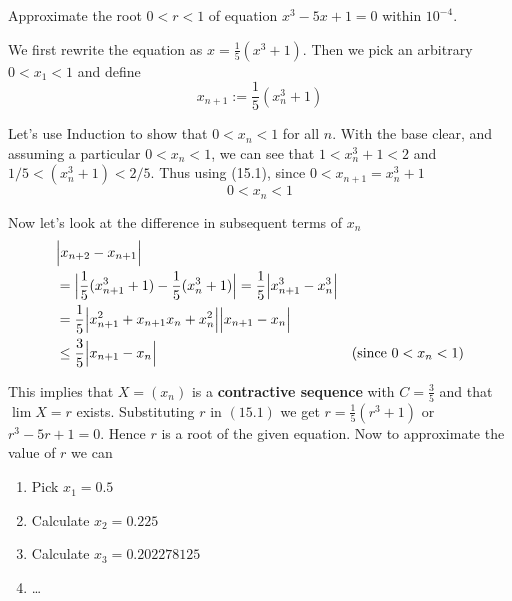 \documentclass[boxes, qed]{homework}
\DeclarePairedDelimiter\abs{\lvert}{\rvert}
\begin{document}
\newenvironment{amatrix}[1]{%
  \left[\begin{array}{@{}*{#1}{c}|c@{}}
}{%
  \end{array}\right]
}

\newenvironment{augmatrix}[1]{%
  \left[\begin{array}{#1}
}{%
  \end{array}\right]
}
\begin{problem}Approximate the root $0<r<1$ of equation
  $x^3-5x+1=0$ within $10^{-4}$.
\end{problem}
\begin{solution}We first rewrite the equation as $x=\frac{1}{5}(x^3+1)$.
  Then we pick an arbitrary $0<x_1<1$ and define
  \begin{equation}
    x_{n+1}:=\frac{1}{5}(x_n^3+1)
  \end{equation}

  Let's use Induction to show that $0<x_n<1$ for all $n$. With the base clear,
  and assuming a particular $0<x_n<1$, we can see that $1<x_n^3+1<2$
  and $1/5<(x_n^3+1)<2/5$. Thus using (15.1), since $0<x_{n+1}=x_n^3+1$
  \begin{equation}
    0<x_n<1
  \end{equation}

  Now let's look at the difference in subsequent terms of $x_n$
  \begin{align*}
      &\abs[\Big]{x_{n+2}-x_{n+1}}\\
      &=\abs[\Big]{
        \frac{1}{5}(x_{n+1}^3+1)
        -\frac{1}{5}(x_{n}^3+1)
      }
      =\frac{1}{5}
      \abs[\Big]{x_{n+1}^3 - x_{n}^3}\\
      &=\frac{1}{5}
      \abs[\Big]{x_{n+1}^2 + x_{n+1}x_{n} + x_{n}^2}
      \abs[\Big]{x_{n+1}- x_{n}}\\
      &\le\frac{3}{5}\abs[\Big]{x_{n+1}- x_{n}}
      &\text{(since $0<x_n<1$)}
  \end{align*}

  This implies that $X=(x_n)$ is a \textbf{contractive sequence} with $C=\frac{3}{5}$
  and that $\lim{X}=r$ exists. Substituting $r$ in $(15.1)$ we get
  $r=\frac{1}{5}(r^3+1)$ or $r^3-5r+1=0$. Hence $r$ is a root of the given equation.
  Now to approximate the value of $r$ we can
  \begin{enumerate}
    \item Pick $x_1=0.5$
    \item Calculate $x_2=0.225$
    \item Calculate $x_3=0.202278125$
    \item \dots
  \end{enumerate}
  

\end{solution}
\end{document}

